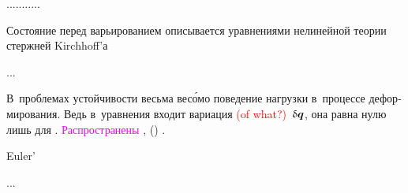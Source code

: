 ...........





\label{section:rodsclassicalstability}

\begin{otherlanguage}{russian}

Состояние перед варьированием описывается уравнениями нелинейной теории стержней Kirchhoff’а

...



\end{otherlanguage}



\label{section:trackingloads}


\begin{otherlanguage}{russian}

В~проблемах устойчивости весьма вес\'{о}мо поведение нагрузки в~процессе деформирования.
Ведь в~уравнения входит вариация \textcolor{red}{(of what?)}~${\updelta\hspace{-0.1ex}\bm{q}}$, она равна нулю лишь для  .
\textcolor{magenta}{Распространены}
,
()
.

 Euler’


...



\end{otherlanguage}

